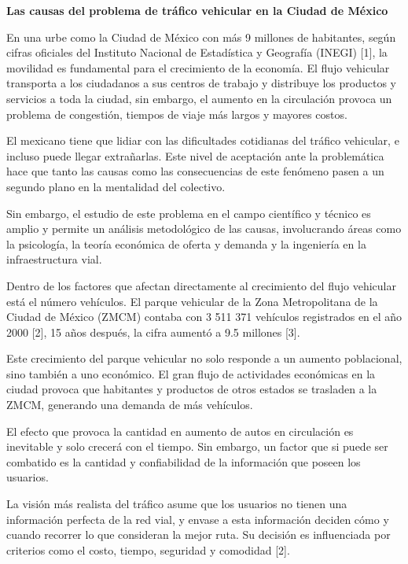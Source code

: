 \documentclass[12pt]{article}
\begin{document}
    \begin{center}
        \textbf{Las causas del problema de tráfico vehicular en la Ciudad de México}
    \end{center}

    \noindent En una urbe como la Ciudad de México con más 9 millones de habitantes, según cifras oficiales del Instituto Nacional de Estadística y Geografía (INEGI) [1], la movilidad es fundamental para el crecimiento de la economía. El flujo vehicular transporta a los ciudadanos a sus centros de trabajo y distribuye los productos y servicios a toda la ciudad, sin embargo, el aumento en la circulación provoca un problema de congestión, tiempos de viaje más largos y mayores costos.

    El mexicano tiene que lidiar con las dificultades cotidianas del tráfico vehicular, e incluso puede llegar extrañarlas. Este nivel de aceptación ante la problemática hace que tanto las causas como las consecuencias de este fenómeno pasen a un segundo plano en la mentalidad del colectivo.

    Sin embargo, el estudio de este problema en el campo científico y técnico es amplio y permite un análisis metodológico de las causas, involucrando áreas como la psicología, la teoría económica de oferta y demanda y la ingeniería en la infraestructura vial.  

    Dentro de los factores que afectan directamente al crecimiento del flujo vehicular está el número vehículos. El parque vehicular de la Zona Metropolitana de la Ciudad de México (ZMCM) contaba con 3 511 371 vehículos registrados en el año 2000 [2], 15 años después, la cifra aumentó a 9.5 millones [3]. 

    Este crecimiento del parque vehicular no solo responde a un aumento poblacional, sino también a uno económico. El gran flujo de actividades económicas en la ciudad provoca que habitantes y productos de otros estados se trasladen a la ZMCM, generando una demanda de más vehículos. 

    El efecto que provoca la cantidad en aumento de autos en circulación es inevitable y solo crecerá con el tiempo. Sin embargo, un factor que si puede ser combatido es la cantidad y confiabilidad de la información que poseen los usuarios.
    
    La visión más realista del tráfico asume que los usuarios no tienen una información perfecta de la red vial, y envase a esta información deciden cómo y cuando recorrer lo que consideran la mejor ruta. Su decisión es influenciada por criterios como el costo, tiempo, seguridad y comodidad [2].
\end{document}
